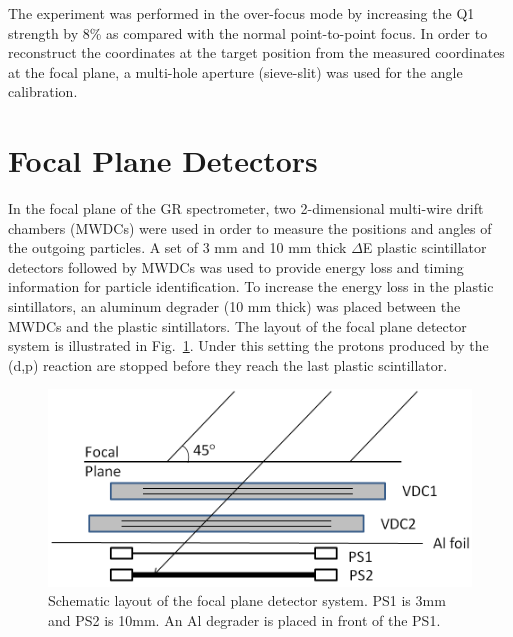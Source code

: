 The experiment was performed in the over-focus mode by increasing the Q1 strength by 8\% as compared with the  normal point-to-point focus. In order to  reconstruct the coordinates at the target position from the measured coordinates at the focal plane, a multi-hole aperture (sieve-slit) was used for the angle calibration.


\section{Focal Plane Detectors}
In the focal plane of the GR spectrometer, two 2-dimensional multi-wire drift chambers (MWDCs) were used in order to measure the positions and angles of the outgoing particles. A set of 3 mm and 10 mm thick $\Delta$E plastic scintillator detectors followed by MWDCs was used to provide energy loss and timing information for particle identification. To increase the energy loss in the plastic sintillators, an aluminum degrader (10 mm thick) was placed between the MWDCs and the plastic sintillators. The layout of the focal plane detector system is illustrated in  Fig.~\ref{fig:PSs}. Under this setting the protons produced by the (d,p) reaction are stopped before they reach the last  plastic scintillator.

\begin{figure}[tpb]
  \begin{center}
    \centerline{\includegraphics[scale=0.6]{graph/ch3/PSs_new}}
    \caption{Schematic layout of the focal plane detector system. PS1 is 3mm and PS2 is 10mm. An Al degrader is placed in front of the PS1.}
    \label{fig:PSs}
  \end{center}
\end{figure}

